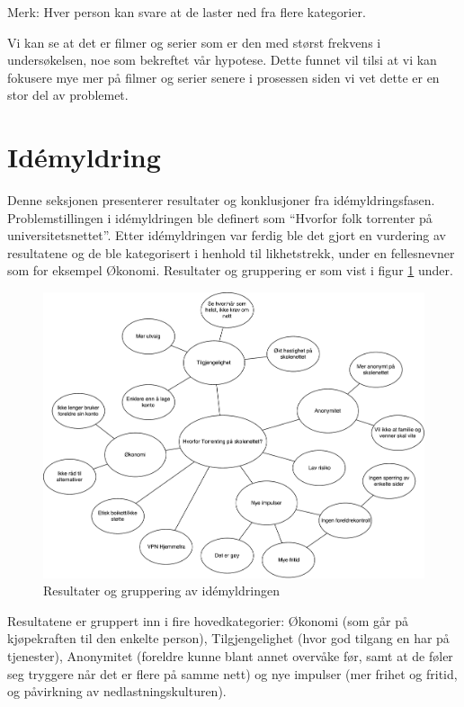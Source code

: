 Merk: Hver person kan svare at de laster ned fra flere kategorier.

\noindent Vi kan se at det er filmer og serier som er den med størst frekvens i undersøkelsen, noe som bekreftet vår hypotese. Dette funnet vil tilsi at vi kan fokusere mye mer på filmer og serier senere i prosessen siden vi vet dette er en stor del av problemet. 

\section{Idémyldring}
Denne seksjonen presenterer resultater og konklusjoner fra idémyldringsfasen. 
Problemstillingen i idémyldringen ble definert som ``Hvorfor folk torrenter på universitetsnettet''. Etter idémyldringen var ferdig ble det gjort en vurdering av resultatene og de ble kategorisert i henhold til likhetstrekk, under en fellesnevner som for eksempel Økonomi. Resultater og gruppering er som vist i figur \ref{fig:case1-idemyldring} under.  

\begin{figure}[H]
    \centering    
    \includegraphics[scale=0.45]{case_1/bilder/idemyldring}
    \caption[Idémyldring av fildeling]{Resultater og gruppering av idémyldringen}
    \label{fig:case1-idemyldring}
\end{figure}

Resultatene er gruppert inn i fire hovedkategorier: Økonomi (som går på kjøpekraften til den enkelte person), Tilgjengelighet (hvor god tilgang en har på tjenester), Anonymitet (foreldre kunne blant annet overvåke før, samt at de føler seg tryggere når det er flere på samme nett) og nye impulser (mer frihet og fritid, og påvirkning av nedlastningskulturen).

